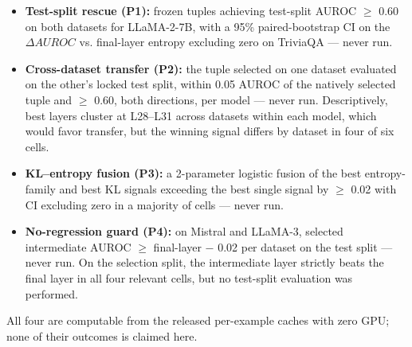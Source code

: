 \begin{itemize}
\item \textbf{Test-split rescue (P1):} frozen tuples achieving test-split AUROC $\geq$ 0.60 on both datasets for LLaMA-2-7B, with a 95\% paired-bootstrap CI on the $\Delta AUROC$ vs. final-layer entropy excluding zero on TriviaQA --- never run.
\item \textbf{Cross-dataset transfer (P2):} the tuple selected on one dataset evaluated on the other's locked test split, within 0.05 AUROC of the natively selected tuple and $\geq$ 0.60, both directions, per model --- never run. Descriptively, best layers cluster at L28--L31 across datasets within each model, which would favor transfer, but the winning signal differs by dataset in four of six cells.
\item \textbf{KL--entropy fusion (P3):} a 2-parameter logistic fusion of the best entropy-family and best KL signals exceeding the best single signal by $\geq$ 0.02 with CI excluding zero in a majority of cells --- never run.
\item \textbf{No-regression guard (P4):} on Mistral and LLaMA-3, selected intermediate AUROC $\geq$ final-layer $-$ 0.02 per dataset on the test split --- never run. On the selection split, the intermediate layer strictly beats the final layer in all four relevant cells, but no test-split evaluation was performed.
\end{itemize}

All four are computable from the released per-example caches with zero GPU; none of their outcomes is claimed here.
